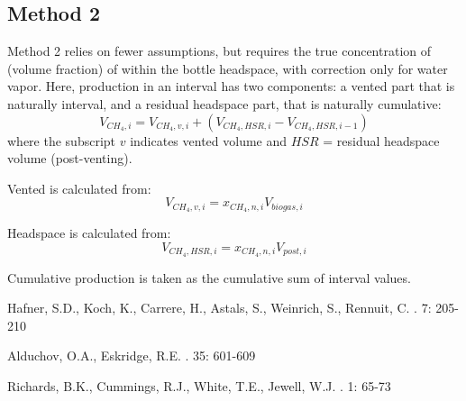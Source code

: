 \documentclass[]{article}
\begin{document}
\subsection{Method 2}
Method 2 relies on fewer assumptions, but requires the true concentration of  (volume fraction) of  within the bottle headspace, with correction only for water vapor.
Here,  production in an interval has two components: a vented part that is naturally interval, and a residual headspace part, that is naturally cumulative:
\begin{equation}
  V_{CH_4, i} = V_{CH_4, v, i} + ( V_{CH_4, HSR, i} - V_{CH_4, HSR, i-1} )
\end{equation}
where the subscript $v$ indicates vented volume and $HSR$ = residual headspace volume (post-venting).

Vented  is calculated from:
\begin{equation}
  V_{CH_4, v, i} = x_{CH_4, n, i} V_{biogas, i}
\end{equation}

Headspace  is calculated from:
\begin{equation}
  V_{CH_4, HSR, i} = x_{CH_4, n, i} V_{post, i}
\end{equation}

Cumulative production is taken as the cumulative sum of interval values. 

\newpage
\begin{thebibliography}{1}

Hafner, S.D., Koch, K., Carrere, H., Astals, S., Weinrich, S., Rennuit, C.
    . 
     7: 205-210

Alduchov, O.A., Eskridge, R.E.    
    . 
     35: 601-609

Richards, B.K., Cummings, R.J., White, T.E., Jewell, W.J.    
    . 
     1: 65-73

\end{thebibliography}


%
\end{document}
